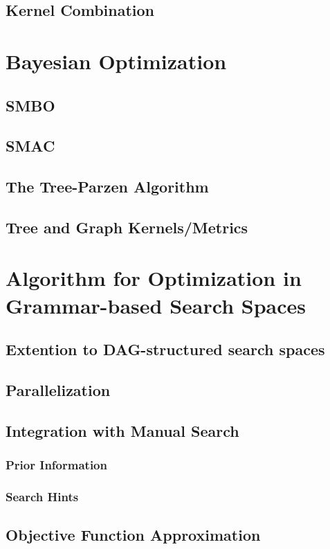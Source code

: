 \documentclass[english]{article}
\begin{document}
\subsection{Kernel Combination}


\section{Bayesian Optimization}
\subsection{SMBO}
\subsection{SMAC}
\subsection{The Tree-Parzen Algorithm}
\subsection{Tree and Graph Kernels/Metrics}


\section{Algorithm for Optimization in Grammar-based Search Spaces}
\subsection{Extention to DAG-structured search spaces}
\subsection{Parallelization}
\subsection{Integration with Manual Search}
\subsubsection{Prior Information}
\subsubsection{Search Hints}
\subsection{Objective Function Approximation}
\end{document}
